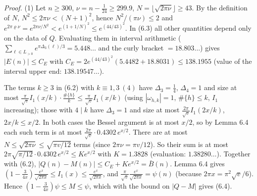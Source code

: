 \emph{Proof.} (1) Let \(n\ge300\), \(\nu=n-\frac1{24}\ge299.9\), \(N=\lfloor\sqrt{2\pi\nu}\rfloor\ge43\). By the definition of \(N\), \(N^2\le2\pi\nu<(N+1)^2\), hence \(N^2/(\pi\nu)\le2\) and \(e^{2\pi\varrho\nu}=e^{2\pi\nu/N^2}<e^{(1+1/N)^2}\le e^{(44/43)^2}\). In (6.3) all other quantities depend only on the data of \(Q\). Evaluating them in interval arithmetic (\(\sum_{\ell\in L_{>0}}e^{\pi\Delta_3(\ell)/3}=5.448\ldots\) and the curly bracket \(=18.803\ldots\)) gives \(|E(n)|\le C_E\) with \(C_E=2e^{(44/43)^2}(5.4482+18.8031)\le138.1955\) (value of the interval upper end: \(138.19547\ldots\)).

The terms \(k\ge3\) in (6.2) with \(k\equiv1,3\ (4)\) have \(\Delta_3=\frac14\), \(\Delta_4=1\) and size at most \(\frac{\pi}{\sqrt v}I_1(x/k)\cdot\frac{\#\{h\}}{k}\le\frac\pi{\sqrt v}I_1(x/k)\) (using \(|\omega_{h,k}|=1\), \(\#\{h\}\le k\), \(I_1\) increasing); those with \(4\mid k\) have \(\Delta_3=1\) and size at most \(\frac{2\pi}{\sqrt v}I_1(2x/k)\), \(2x/k\le x/2\). In both cases the Bessel argument is at most \(x/2\), so by Lemma 6.4 each such term is at most \(\frac{2\pi}{\sqrt v}\cdot0.4302\,e^{x/2}\). There are at most \(N\le\sqrt{2\pi\nu}\le\sqrt{\pi v/12}\) terms (since \(2\pi\nu=\pi v/12\)). So their sum is at most \(2\pi\sqrt{\pi/12}\cdot0.4302\,e^{x/2}\le Ke^{x/2}\) with \(K=1.3828\) (evaluation: \(1.38280\ldots\)). Together with (6.2), \(|Q(n)-M(n)|\le C_E+Ke^{x/2}=\bar B(n)\). Lemma 6.4 gives \((1-\frac3{4x})\frac{e^x}{\sqrt{2\pi x}}\le I_1(x)\le\frac{e^x}{\sqrt{2\pi x}}\), and \(\frac{\pi}{\sqrt v}\frac{e^x}{\sqrt{2\pi x}}=\psi(n)\) (because \(2\pi x=\pi^2\sqrt v/6\)). Hence \((1-\frac3{4x})\psi\le M\le\psi\), which with the bound on \(|Q-M|\) gives (6.4).


